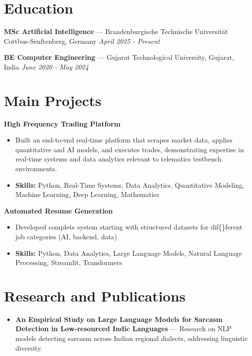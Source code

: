 \documentclass[a4paper,10pt]{article}
\begin{document}
\section*{Education}
\textbf{MSc Artificial Intelligence} — Brandenburgische Technische Universität Cottbus-Senftenberg, Germany \hfill \textit{April 2025 - Present}\par
\vspace{1.5pt}
\textbf{BE Computer Engineering} — Gujarat Technological University, Gujarat, India \hfill \textit{June 2020 - May 2024}\par

\section*{Main Projects}
\textbf{High Frequency Trading Platform}\par
\vspace{1pt}
\begin{itemize}
  \item Built an end-to-end real-time platform that scrapes market data, applies quantitative and AI models, and executes trades, demonstrating expertise in real-time systems and data analytics relevant to telematics testbench environments.
  \item \textbf{Skills:} Python, Real-Time Systems, Data Analytics, Quantitative Modeling, Machine Learning, Deep Learning, Mathematics
\end{itemize}
\vspace{3pt}
\textbf{Automated Resume Generation}\par
\vspace{1pt}
\begin{itemize}
  \item Developed complete system starting with structured datasets for dif\{\}ferent job categories (AI, backend, data)
  \item \textbf{Skills:} Python, Data Analytics, Large Language Models, Natural Language Processing, Streamlit, Transformers
\end{itemize}

\section*{Research and Publications}
\begin{itemize}
\item \textbf{An Empirical Study on Large Language Models for Sarcasm Detection in Low-resourced Indic Languages} — Research on NLP models detecting sarcasm across Indian regional dialects, addressing linguistic diversity.
\end{itemize}
\end{document}
